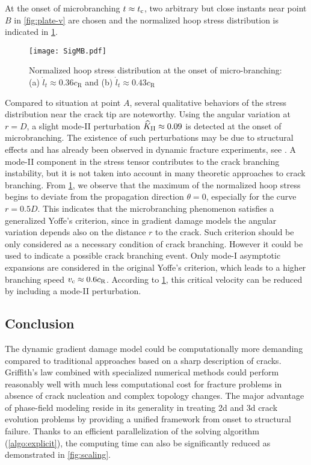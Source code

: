 At the onset of microbranching $t\approx t_{\mathrm{c}}$, two arbitrary but close instants near point $B$ in \cref{fig:plate-v} are chosen and the normalized hoop stress distribution is indicated in \cref{fig:SigMB}.
\begin{figure}[htbp]
\centering
\texttt{[image: SigMB.pdf]}
\caption{Normalized hoop stress distribution at the onset of micro-branching: (a) $\dot{l}_t\approx 0.36c_\mathrm{R}$ and (b) $\dot{l}_t\approx 0.43c_\mathrm{R}$} \label{fig:SigMB}
\end{figure}
Compared to situation at point $A$, several qualitative behaviors of the stress distribution near the crack tip are noteworthy. Using the angular variation at $r=D$, a slight mode-II perturbation $\widehat{K}_\RN{2}\approx 0.09$ is detected at the onset of microbranching. The existence of such perturbations may be due to structural effects and has already been observed in dynamic fracture experiments, see \cite{BoueCohenFineberg:2015}. A mode-II component in the stress tensor contributes to the crack branching instability, but it is not taken into account in many theoretic approaches to crack branching. From \cref{fig:SigMB}, we observe that the maximum of the normalized hoop stress begins to deviate from the propagation direction $\theta=0$, especially for the curve $r=0.5D$. This indicates that the microbranching phenomenon satisfies a generalized Yoffe's criterion, since in gradient damage models the angular variation depends also on the distance $r$ to the crack. Such criterion should be only considered as a necessary condition of crack branching. However it could be used to indicate a possible crack branching event. Only mode-I asymptotic expansions are considered in the original Yoffe's criterion, which leads to a higher branching speed $v_{\mathrm{c}}\approx 0.6c_\mathrm{R}$. According to \cref{fig:SigMB}, this critical velocity can be reduced by including a mode-II perturbation.

\subsection*{Conclusion}
The dynamic gradient damage model could be computationally more demanding compared to traditional approaches based on a sharp description of cracks. Griffith's law combined with specialized numerical methods could perform reasonably well with much less computational cost for fracture problems in absence of crack nucleation and complex topology changes. The major advantage of phase-field modeling reside in its generality in treating 2d and 3d crack evolution problems by providing a unified framework from onset to structural failure. Thanks to an efficient parallelization of the solving algorithm (\cref{algo:explicit}), the computing time can also be significantly reduced as demonstrated in \cref{fig:scaling}.

